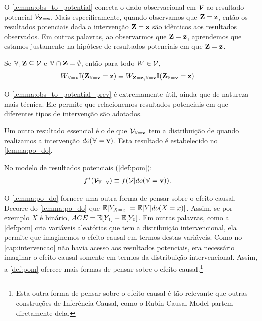 O \cref{lemma:obs_to_potential} conecta
o dado observacional em ${\mathcal V}$ ao
resultado potencial ${\mathcal V}_{{\mathbf{Z}}={\mathbf{z}}}$.
Mais especificamente, quando 
observamos que ${\mathbf{Z}}={\mathbf{z}}$, então
os resultados potenciais dada a
intervenção ${\mathbf{Z}}={\mathbf{z}}$ são
idênticos aos resultados observados.
Em outras palavras,
ao observarmos que ${\mathbf{Z}}={\mathbf{z}}$, aprendemos que
estamos justamente na hipótese
de resultados potenciais em que ${\mathbf{Z}}={\mathbf{z}}$.

\begin{lemma}
 \label{lemma:obs_to_potential_prev}
 Se ${\mathbb V}, {\mathbf{Z}} \subseteq {\mathcal V}$ e
 ${\mathbb V} \cap {\mathbf{Z}} = \emptyset$, então
 para todo $W \in {\mathcal V}$,
 \begin{align*}
  W_{{\mathbb V}={\mathbf{v}}} {\mathbb I}({\mathbf{Z}}_{{\mathbb V}={\mathbf{v}}} = {\mathbf{z}})
  &\equiv W_{{\mathbf{Z}} = {\mathbf{z}}, {\mathbb V}={\mathbf{v}}} {\mathbb I}({\mathbf{Z}}_{{\mathbb V}={\mathbf{v}}} = {\mathbf{z}})
 \end{align*}
\end{lemma}

O \cref{lemma:obs_to_potential_prev} é extremamente útil,
ainda que de natureza mais técnica.
Ele permite que relacionemos resultados potenciais em que
diferentes tipos de intervenção são adotados.

Um outro resultado essencial é
o de que ${\mathcal V}_{{\mathbb V}={\mathbf{v}}}$ tem
a distribuição de quando
realizamos a intervenção $do({\mathbb V}={\mathbf{v}})$.
Esta resultado é estabelecido
no \cref{lemma:po_do}.

\begin{lemma}
 \label{lemma:po_do}
 No modelo de resultados potenciais (\cref{def:pom}):
 \begin{align*}
  f^*({\mathcal V}_{{\mathbb V}={\mathbf{v}}})
  &\equiv f({\mathcal V}|do({\mathbb V}={\mathbf{v}})).
 \end{align*}
\end{lemma}

O \cref{lemma:po_do} fornece 
uma outra forma de pensar sobre o efeito causal.
Decorre do \cref{lemma:po_do} que
${\mathbb E}[Y_{X=x}] = {\mathbb E}[Y|do(X=x)]$. Assim,
se por exemplo $X$ é binário,
${ACE} = {\mathbb E}[Y_1] - {\mathbb E}[Y_0]$.
Em outras palavras, 
como a \cref{def:pom} cria 
variáveis aleatórias que tem a distribuição intervencional,
ela permite que imaginemos o efeito causal
em termos destas variáveis.
Como no \cref{cap:intervencao} 
não havia acesso aos resultados potenciais, 
era necessário imaginar o efeito causal
somente em termos da distribuição intervencional.
Assim, a \cref{def:pom} oferece
mais formas de pensar sobre o efeito causal.\footnote{
 Esta outra forma de pensar sobre o efeito causal é
 tão relevante que outras construções de Inferência Causal,
 como o Rubin Causal Model \citep{Holland1986} partem
 diretamente dela.
}


